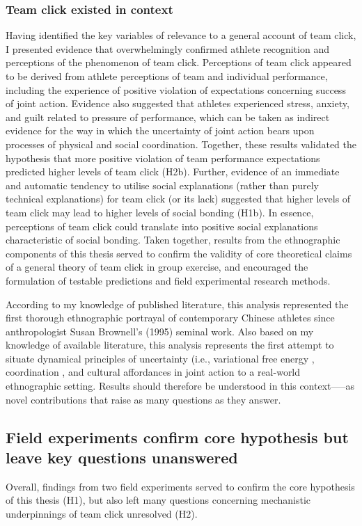 \subsubsection{Team click existed in context}
Having identified the key variables of relevance to a general account of team click, I presented evidence that overwhelmingly confirmed athlete recognition and perceptions of the phenomenon of team click.  Perceptions of team click appeared to be derived from athlete perceptions of team and individual performance, including the experience of positive violation of expectations concerning success of joint action.  Evidence also suggested that athletes experienced stress, anxiety, and guilt related to pressure of performance, which can be taken as indirect evidence for the way in which the uncertainty of joint action bears upon processes of physical and social coordination.  Together, these results validated the hypothesis that more positive violation of team performance expectations predicted higher levels of team click (H2b).  Further, evidence of an immediate and automatic tendency to utilise social explanations (rather than purely technical explanations) for team click (or its lack) suggested that higher levels of team click may lead to higher levels of social bonding (H1b). In essence, perceptions of team click could translate into positive social explanations characteristic of social bonding.  Taken together, results from the ethnographic components of this thesis served to confirm the validity of core theoretical claims of a general theory of team click in group exercise, and encouraged the formulation of testable predictions and field experimental research methods.

According to my knowledge of published literature, this analysis represented the first thorough ethnographic portrayal of contemporary Chinese athletes since anthropologist Susan Brownell's (1995) seminal work.  Also based on my knowledge of available literature, this analysis represents the first attempt to situate dynamical principles of uncertainty (i.e., variational free energy \citep{Friston2010}, coordination \citep{Kelso2009}, and cultural affordances \citep{Ramstead2016} in joint action to a real-world ethnographic setting.  Results should therefore be understood in this context—--as novel contributions that raise as many questions as they answer.

\subsection{Field experiments confirm core hypothesis but leave key questions unanswered}
Overall, findings from two field experiments served to confirm the core hypothesis of this thesis (H1),  but also left many questions concerning mechanistic underpinnings of team click unresolved (H2).

